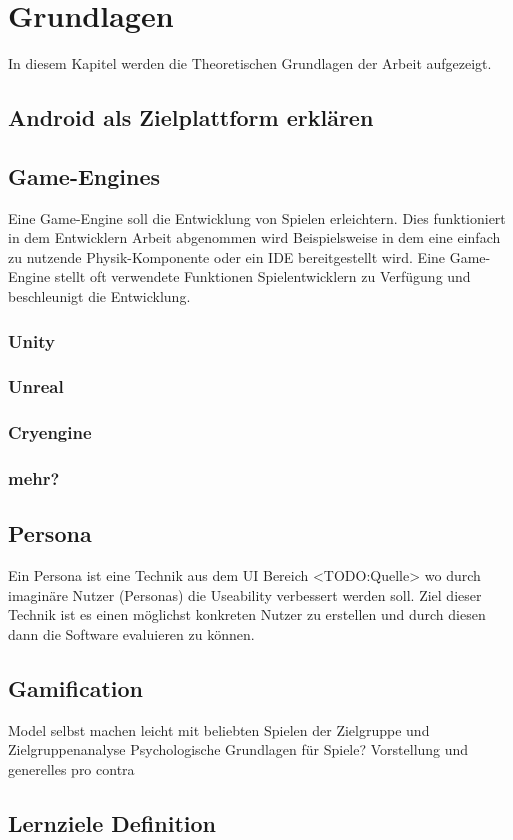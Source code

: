 \section{Grundlagen}
	In diesem Kapitel werden die Theoretischen Grundlagen der Arbeit aufgezeigt.
\subsection{Android als Zielplattform erklären}
\subsection{Game-Engines}
	Eine Game-Engine soll die Entwicklung von Spielen erleichtern. Dies funktioniert in dem Entwicklern Arbeit abgenommen wird Beispielsweise in dem eine einfach zu nutzende Physik-Komponente oder ein \gls{IDE} bereitgestellt wird. Eine Game-Engine stellt oft verwendete Funktionen Spielentwicklern zu Verfügung und beschleunigt die Entwicklung.
	\subsubsection{Unity}
	\subsubsection{Unreal}
	\subsubsection{Cryengine}
	\subsubsection{mehr?}
\subsection{Persona}\label{ssec:persona}
	Ein Persona ist eine Technik aus dem UI Bereich <TODO:Quelle> wo durch imaginäre Nutzer (Personas) die Useability verbessert werden soll. Ziel dieser Technik ist es einen möglichst konkreten Nutzer zu erstellen und durch diesen dann die Software evaluieren zu können.
\subsection{Gamification}
	Model selbst machen leicht mit beliebten Spielen der Zielgruppe und Zielgruppenanalyse
	Psychologische Grundlagen für Spiele?
	Vorstellung und generelles pro contra
\subsection{Lernziele Definition}
